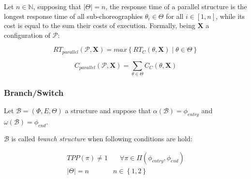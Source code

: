 \documentclass[12pt,a4paper]{report}
\newcommand*{\N}{\mathbb{N}}
\theoremstyle{definition}
\begin{document}
Let $n \in \N$, supposing that $|\Theta| = n$, the response time of a parallel structure is the longest response time of all sub-choreographies $\theta_i \in \Theta$ for all $i \in \left[ 1, n \right]$, while its cost is equal to the sum their costs of execution. Formally, being $\textbf{X}$ a configuration of  $\mathcal{P}$:

\begin{equation}
	RT_{parallel}(\mathcal{P}, \textbf{X}) = max \left\lbrace RT_C(\mathcal{\theta}, \textbf{X}) \mid \theta \in \Theta \right\rbrace 
\end{equation}

\begin{equation}
	C_{parallel}(\mathcal{P}, \textbf{X}) = \sum_{\theta \in \Theta} C_C(\theta, \textbf{X})
\end{equation}



\subsubsection{Branch/Switch}

Let $\mathcal{B} = (\Phi,E,\Theta)$ a structure and suppose that $\alpha(\mathcal{B}) = \phi_{entry}$ and $\omega(\mathcal{B}) = \phi_{end}$. 

$\mathcal{B}$ is called \textit{branch structure} when following conditions are hold:

\begin{eqnarray}
	TPP(\pi) \neq 1  & \quad \forall \pi \in \Pi(\phi_{entry}, \phi_{end}) \\
	|\Theta| = n  & n \in \left\lbrace 1,2 \right\rbrace 
\end{eqnarray}
\end{document}
